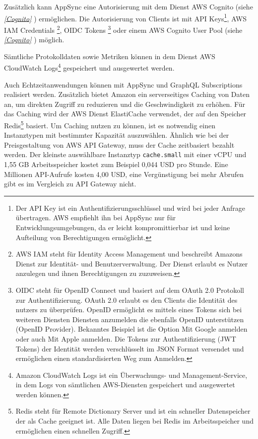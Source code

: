 Zusätzlich kann AppSync eine Autorisierung mit dem Dienst AWS Cognito (siehe \textit{\ref{Cognito} }) ermöglichen.
Die Autorisierung von Clients ist mit API Keys\footnote{Der API Key ist ein Authentifizierungsschlüssel und wird bei jeder Anfrage übertragen. AWS empfiehlt ihn bei AppSync nur für Entwicklungsumgebungen,
da er leicht kompromittierbar ist und keine Aufteilung von Berechtigungen ermöglicht.}, AWS IAM Credentials \footnote{
    AWS IAM steht für Identity Access Management und beschreibt Amazons Dienst zur Identität- und Benutzerverwaltung. Der Dienst erlaubt es Nutzer anzulegen und
    ihnen Berechtigungen zu zuzuweisen.},
    OIDC Tokens \footnote{OIDC steht für OpenID Connect und basiert auf dem OAuth 2.0 Protokoll zur Authentifizierung.
    OAuth 2.0 erlaubt es den Clients die Identität des nutzers zu überprüfen.
    OpenID ermöglicht es mittels eines Tokens sich bei weiteren Diensten Diensten anzumelden die ebenfalls OpenID unterstützen (OpenID Provider).
    Bekanntes Beispiel ist die Option \glqq Mit Google anmelden\grqq{} oder auch \glqq Mit Apple anmelden\grqq.
    Die Tokens zur Authentifizierung (JWT Tokens) der Identität werden verschlüsselt im JSON Format versendet und ermöglichen einen standardisierten Weg zum Anmelden.

          } oder einem AWS
Cognito User Pool (siehe \textit{\ref{Cognito} }) möglich. \cite{AppSyncAuth}

Sämtliche Protokolldaten sowie Metriken können in dem Dienst AWS CloudWatch Logs\footnote{ Amazon CloudWatch Logs ist ein Überwachungs- und Management-Service, in dem Logs von sämtlichen AWS-Diensten gespeichert und ausgewertet werden können. } gespeichert und ausgewertet werden.

Auch Echtzeitanwendungen können mit AppSync und GraphQL Subscriptions realisiert werden.
Zusätzlich bietet Amazon ein serverseitiges Caching von Daten an, um direkten Zugriff zu reduzieren und die Geschwindigkeit zu erhöhen.
Für das Caching wird der AWS Dienst ElastiCache verwendet, der auf den Speicher Redis\footnote{Redis steht für Remote Dictionary Server und ist ein schneller Datenspeicher der als Cache geeignet ist. Alle Daten liegen bei Redis im Arbeitsspeicher und ermöglichen einen schnellen Zugriff.} basiert.
Um Caching nutzen zu können, ist es notwendig einen Instanztypen mit bestimmter Kapazität auszuwählen.
Ähnlich wie bei der Preisgestaltung von AWS API Gateway, muss der Cache zeitbasiert bezahlt werden.
Der kleinste auswählbare Instanztyp \verb+cache.small+ mit einer vCPU und 1,55 GB Arbeitsspeicher kostet zum Beispiel 0,044 USD pro Stunde.
Eine Millionen API-Aufrufe kosten 4,00 USD, eine Vergünstigung bei mehr Abrufen gibt es im Vergleich zu API Gateway nicht.
\cite{AppSync} \cite{AppSyncPreise}


